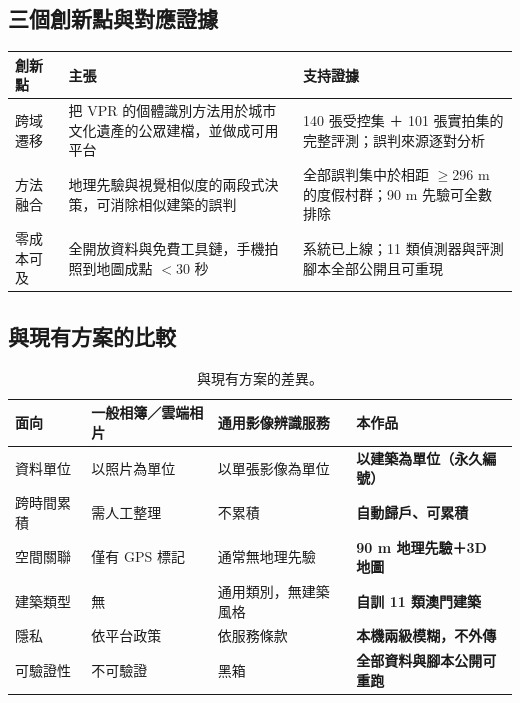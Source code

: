 \documentclass[11pt,a4paper,fontset=windows]{ctexart}
\begin{document}
\subsection{三個創新點與對應證據}
\begin{table}[H]
\centering\small
\begin{tabular}{@{}p{2.5cm}p{6.0cm}p{6.4cm}@{}}
\toprule
\textbf{創新點} & \textbf{主張} & \textbf{支持證據} \\
\midrule
跨域遷移 & 把 VPR 的個體識別方法用於城市文化遺產的公眾建檔，並做成可用平台 & 140 張受控集 ＋ 101 張實拍集的完整評測；誤判來源逐對分析 \\
方法融合 & 地理先驗與視覺相似度的兩段式決策，可消除相似建築的誤判 & 全部誤判集中於相距 $\ge$296 m 的度假村群；90 m 先驗可全數排除 \\
零成本可及 & 全開放資料與免費工具鏈，手機拍照到地圖成點 $<$30 秒 & 系統已上線；11 類偵測器與評測腳本全部公開且可重現 \\
\bottomrule
\end{tabular}
\end{table}

\subsection{與現有方案的比較}
\begin{table}[H]
\centering\small
\begin{tabular}{@{}p{2.9cm}p{3.9cm}p{3.9cm}p{3.9cm}@{}}
\toprule
\textbf{面向} & \textbf{一般相簿／雲端相片} & \textbf{通用影像辨識服務} & \textbf{本作品} \\
\midrule
資料單位 & 以照片為單位 & 以單張影像為單位 & \textbf{以建築為單位（永久編號）} \\
跨時間累積 & 需人工整理 & 不累積 & \textbf{自動歸戶、可累積} \\
空間關聯 & 僅有 GPS 標記 & 通常無地理先驗 & \textbf{90 m 地理先驗＋3D 地圖} \\
建築類型 & 無 & 通用類別，無建築風格 & \textbf{自訓 11 類澳門建築} \\
隱私 & 依平台政策 & 依服務條款 & \textbf{本機兩級模糊，不外傳} \\
可驗證性 & 不可驗證 & 黑箱 & \textbf{全部資料與腳本公開可重跑} \\
\bottomrule
\end{tabular}
\caption{與現有方案的差異。}
\end{table}
\end{document}
